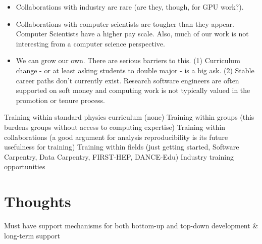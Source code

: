 \begin{itemize}
\item Collaborations with industry are rare (are they, though, for GPU work?).  
\item Collaborations with computer scientists are tougher than they appear.  Computer Scientists have a higher pay scale.  Also, much of our work is not interesting from a computer science perspective.
\item We can grow our own.  There are serious barriers to this.  (1) Curriculum change - or at least asking students to double major - is a big ask.  (2) Stable career paths don't currently exist.  Research software engineers are often supported on soft money and computing work is not typically valued in the promotion or tenure process.
\end{itemize}

Training within standard physics curriculum (none)
Training within groups (this burdens groups without access to computing expertise)
Training within collaborations (a good argument for analysis reproducibility is its future usefulness for training)
Training within fields (just getting started, Software Carpentry, Data Carpentry, FIRST-HEP, DANCE-Edu)
Industry training opportunities

\section{Thoughts}
Must have support mechanisms for both bottom-up and top-down development \& long-term support





 




% 

